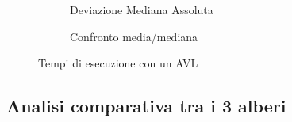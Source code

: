 \documentclass[a4paper,titlepage]{article}
\begin{document}
\begin{figure}[h]
  \centering
  \begin{subfigure}{\textwidth}
    \captionsetup{justification=centering}
     \caption{Deviazione Mediana Assoluta}
     \label{fig:avl_mad}
  \end{subfigure}%
  \vspace{2pt}
  \begin{subfigure}{\textwidth}
    \captionsetup{justification=centering}
     \caption{Confronto media/mediana}
     \label{fig:avl_mean_median}
  \end{subfigure}
  \caption{Tempi di esecuzione con un AVL}
\end{figure}
\newpage

\subsection{Analisi comparativa tra i 3 alberi}
\end{document}
